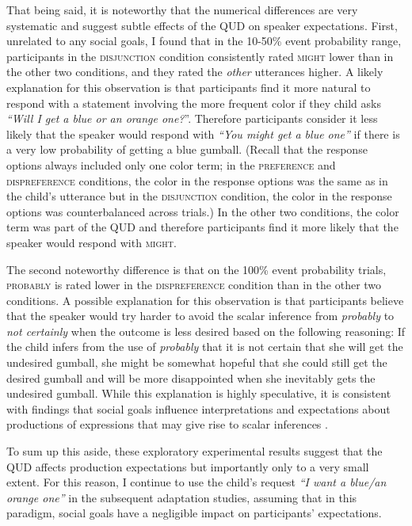 That being said, it is noteworthy that the numerical differences are very systematic and suggest subtle effects of the QUD on speaker expectations. First,
unrelated to any social goals, I found that in the 10-50\% event probability range, participants in the \textsc{disjunction} condition consistently rated \textsc{might}
 lower than in the other two conditions, and they rated the \emph{other} utterances higher. A likely explanation for this observation is that participants find it more natural to respond with a statement
involving the more frequent color if they child asks \emph{``Will I get a blue or an orange one?}''.  Therefore participants consider  it less likely that the speaker
would respond with \emph{``You might get a blue one''} if there is a very low probability of getting a blue gumball. (Recall that the response options always included
only one color term; in the \textsc{preference} and \textsc{dispreference} conditions, the color in the response options was the same as in the child's 
utterance but in the \textsc{disjunction} condition, the color in the response options was counterbalanced across trials.) In the other two conditions, the color term
was part of the QUD and therefore participants find it more likely that the speaker would respond with \textsc{might}.

The second noteworthy difference is that on the 100\% event probability trials, \textsc{probably} is rated lower in the \textsc{dispreference} condition
than in the other two conditions. A possible explanation for this observation is that participants believe that the speaker would try harder to avoid 
the scalar inference from \textit{probably} to \textit{not certainly} when the outcome is less desired based on the following reasoning:
 If the child infers from the use of \textit{probably} that it is not certain that she will get the undesired gumball, she might be somewhat hopeful
 that she could still get the desired gumball and will be more disappointed when she inevitably gets the undesired gumball. While this explanation
 is highly speculative, it is consistent with findings that social goals influence interpretations and expectations about productions of expressions
 that may give rise to scalar inferences \parencite{Bonnefon2009, Yoon2018}.
 
 To sum up this aside, these exploratory experimental results suggest that the QUD affects production expectations but importantly only to a very small
 extent. For this reason, I continue to use the child's request \emph{``I want a blue/an orange one''} in the subsequent adaptation studies, assuming that
 in this paradigm, social goals have a negligible impact on participants' expectations.


